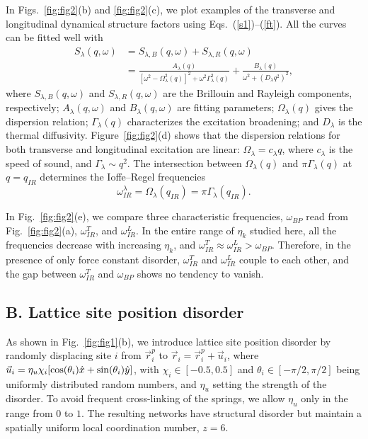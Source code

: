 \documentclass[twocolumn,printnumbers,amsmath,amssymb,prl,verbatim]{revtex4}
\begin{document}
In Figs.~\ref{fig:fig2}(b) and \ref{fig:fig2}(c), we plot examples of the transverse and longitudinal dynamical structure factors using Eqs.~(\ref{s1})--(\ref{ft}). All the curves can be fitted well with \cite{xipeng,hansen}
\begin{equation}
	\begin{split}
S_{\lambda}(q,\omega)
				    & =S_{\lambda, B}(q,\omega)+S_{\lambda,R}(q,\omega)  \\
					& =\frac{A_{\lambda}(q)}{[\omega^2-\Omega_{\lambda}^2{(q)}]^2+\omega^2\Gamma_{\lambda}^2(q)}+\frac{B_{\lambda}(q)}{\omega^2+(D_{\lambda}q^2)^2}, \label{skf}
	\end{split}
\end{equation}
where $S_{\lambda,B}(q,\omega)$ and $S_{\lambda, R}(q,\omega)$ are the Brillouin and Rayleigh components, respectively; $A_{\lambda}(q,\omega)$ and $B_{\lambda}(q, \omega)$ are fitting parameters; $\Omega_{\lambda}(q)$ gives the dispersion relation; $\Gamma_{\lambda}(q)$ characterizes the excitation broadening; and $D_{\lambda}$ is the thermal diffusivity. Figure~\ref{fig:fig2}(d) shows that the dispersion relations for both transverse and longitudinal excitation are linear: $\Omega_{\lambda}=c_{\lambda} q$, where $c_{\lambda}$ is the speed of sound, and $\Gamma_{\lambda}\sim q^2$. The intersection between $\Omega_{\lambda}(q)$ and $\pi\Gamma_{\lambda}(q)$ at $q=q_{IR}$ determines the Ioffe--Regel frequencies \cite{shintani}
\begin{equation}
\omega_{IR}^{\lambda}=\Omega_{\lambda}(q_{IR})=\pi\Gamma_{\lambda}(q_{IR}). \label{ir}
\end{equation}

In Fig.~\ref{fig:fig2}(e), we compare three characteristic frequencies, $\omega_{BP}$ read from Fig.~\ref{fig:fig2}(a), $\omega_{IR}^T$, and $\omega_{IR}^L$. In the entire range of $\eta_k$ studied here, all the frequencies decrease with increasing $\eta_k$, and $\omega_{IR}^T\approx \omega_{IR}^L>\omega_{BP}$. Therefore, in the presence of only force constant disorder, $\omega_{IR}^T$ and $\omega_{IR}^L$ couple to each other, and the gap between $\omega_{IR}^T$ and $\omega_{BP}$ shows no tendency to vanish.

\subsection{B. Lattice site position disorder}
\label{subsec:position}

As shown in Fig.~\ref{fig:fig1}(b), we introduce lattice site position disorder by randomly displacing site $i$ from $\vec{r}_i^p$ to $\vec{r}_i=\vec{r}_i^p+\vec{u}_i$, where $\vec{u}_i=\eta_u \chi_i[{\rm cos}(\theta_i)\hat{x}+{\rm sin}(\theta_i)\hat{y}]$, with $\chi_i\in [-0.5, 0.5]$ and $\theta_i\in[-\pi/2, \pi/2]$ being uniformly distributed random numbers, and $\eta_u$ setting the strength of the disorder. To avoid frequent cross-linking of the springs, we allow $\eta_u$ only in the range from $0$ to $1$. The resulting networks have structural disorder but maintain a spatially uniform local coordination number, $z=6$.
\end{document}
